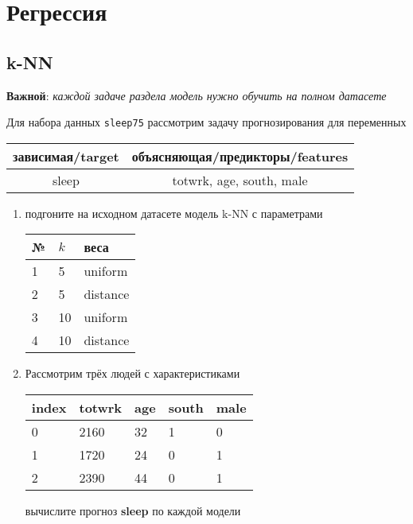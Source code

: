 
\section{Регрессия}

\subsection{k-NN}

\textbf{Важной}: \textit{каждой задаче раздела модель нужно обучить на полном датасете}

\begin{exercise}
Для набора данных \texttt{sleep75} рассмотрим задачу прогнозирования
для переменных
\begin{center}
	\begin{tabular}{|c|c|}\hline
		зависимая/target & объясняющая/предикторы/features \\ \hline
		sleep & totwrk, age, south, male \\ \hline
	\end{tabular}
\end{center}
\begin{enumerate}
	\item подгоните на исходном датасете модель k-NN с параметрами
	\begin{center}
		\begin{tabular}{|l|l|l|}\hline
		№ & \(k\) & веса \\ \hline
		1 & 5 & uniform \\
		2 & 5 & distance \\
		3 & 10 & uniform \\
		4 & 10 & distance \\ \hline
		\end{tabular}
	\end{center}
	\item Рассмотрим трёх людей с характеристиками
	\begin{center}
		\begin{tabular}{|l||l|l|l|l|}\hline
			index & totwrk & age & south & male \\ \hline\hline
			0 & 2160 & 32 & 1 & 0 \\
			1 & 1720 & 24 & 0 & 1 \\
			2 & 2390 & 44 & 0 & 1 \\ \hline
		\end{tabular}
	\end{center}
	вычислите прогноз \textbf{sleep} по каждой модели
\end{enumerate}
\end{exercise}


